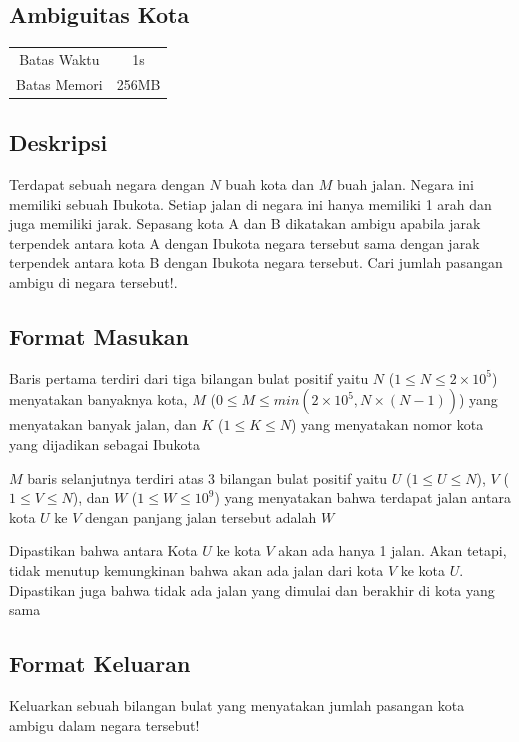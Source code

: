 \documentclass{article}
\begin{document}
\begin{center}

    
    \section*{Ambiguitas Kota} %

    \begin{tabular}{ | c c | }
        \hline
        Batas Waktu  & 1s \\    %
        Batas Memori & 256MB \\  %
        \hline
    \end{tabular}
\end{center}

\subsection*{Deskripsi}
Terdapat sebuah negara dengan $N$ buah kota dan $M$ buah jalan. Negara ini memiliki sebuah Ibukota. Setiap jalan di negara ini hanya memiliki 1 arah dan juga memiliki jarak. Sepasang kota A dan B dikatakan ambigu apabila jarak terpendek antara kota A dengan Ibukota negara tersebut sama dengan jarak terpendek antara kota B dengan Ibukota negara tersebut. Cari jumlah pasangan ambigu di negara tersebut!. 

\subsection*{Format Masukan}
Baris pertama terdiri dari tiga bilangan bulat positif yaitu $N$ ($1 \leq N \leq 2\times10^5$) menyatakan banyaknya kota,
$M$ ($0 \leq M \leq min(2\times10^5, N\times(N-1)) $) yang menyatakan banyak jalan, dan $K$ ($1 \leq K \leq N$) yang menyatakan nomor kota yang dijadikan sebagai Ibukota

$M$ baris selanjutnya terdiri atas 3 bilangan bulat positif yaitu $U$ ($1 \leq U \leq N$), $V$ ($1 \leq V \leq N$), dan $W$ ($1 \leq W \leq 10^9$) yang menyatakan bahwa terdapat jalan antara kota $U$ ke $V$ dengan panjang jalan tersebut adalah $W$

Dipastikan bahwa antara Kota $U$ ke kota $V$ akan ada hanya 1 jalan. Akan tetapi, tidak menutup kemungkinan bahwa akan ada jalan dari kota $V$ ke kota $U$.
Dipastikan juga bahwa tidak ada jalan yang dimulai dan berakhir di kota yang sama
\subsection*{Format Keluaran}
Keluarkan sebuah bilangan bulat yang menyatakan jumlah pasangan kota ambigu dalam negara tersebut!
\end{document}
